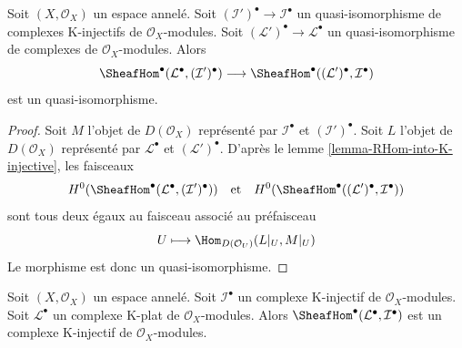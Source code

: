 \begin{lemma}

\label{lemma-RHom-well-defined}

Soit $(X, \mathcal{O}_X)$ un espace annelé. Soit
$(\mathcal{I}')^\bullet \to \mathcal{I}^\bullet$
un quasi-isomorphisme de complexes K-injectifs de $\mathcal{O}_X$-modules. Soit $(\mathcal{L}')^\bullet \to \mathcal{L}^\bullet$
un quasi-isomorphisme de complexes de $\mathcal{O}_X$-modules. Alors
$$
\SheafHom^\bullet(\mathcal{L}^\bullet, (\mathcal{I}')^\bullet)
\longrightarrow
\SheafHom^\bullet((\mathcal{L}')^\bullet, \mathcal{I}^\bullet)
$$
est un quasi-isomorphisme.

\end{lemma}

\begin{proof}
Soit $M$ l'objet de $D(\mathcal{O}_X)$ représenté par $\mathcal{I}^\bullet$ et $(\mathcal{I}')^\bullet$. Soit $L$ l'objet de $D(\mathcal{O}_X)$ représenté par $\mathcal{L}^\bullet$ et $(\mathcal{L}')^\bullet$. D'après le lemme \ref{lemma-RHom-into-K-injective}, les faisceaux $$
H^0(\SheafHom^\bullet(\mathcal{L}^\bullet, (\mathcal{I}')^\bullet))
\quad\text{et}\quad
H^0(\SheafHom^\bullet((\mathcal{L}')^\bullet, \mathcal{I}^\bullet))
$$ sont tous deux égaux au faisceau associé au préfaisceau $$
U \longmapsto \Hom_{D(\mathcal{O}_U)}(L|_U, M|_U)
$$ Le morphisme est donc un quasi-isomorphisme.
\end{proof}

\begin{lemma}

\label{lemma-RHom-from-K-flat-into-K-injective}
Soit $(X, \mathcal{O}_X)$ un espace annelé. Soit $\mathcal{I}^\bullet$ un complexe K-injectif de $\mathcal{O}_X$-modules. Soit $\mathcal{L}^\bullet$ un complexe K-plat de $\mathcal{O}_X$-modules. Alors $\SheafHom^\bullet(\mathcal{L}^\bullet, \mathcal{I}^\bullet)$ est un complexe K-injectif de $\mathcal{O}_X$-modules.
\end{lemma}

